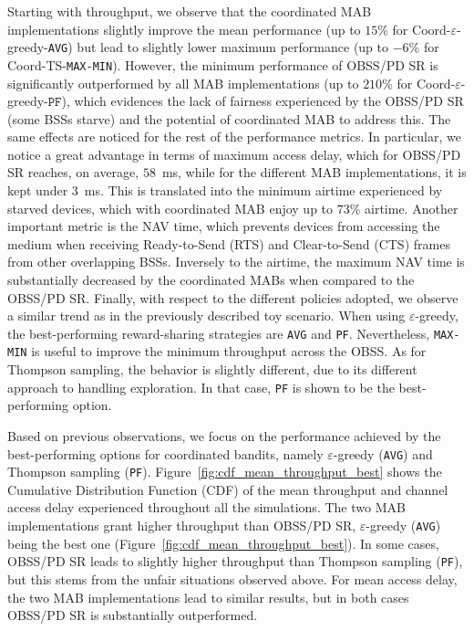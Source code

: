 Starting with throughput, we observe that the coordinated MAB implementations slightly improve the mean performance (up to $15$\% for Coord-$\varepsilon$-greedy-\texttt{AVG}) but lead to slightly lower maximum performance (up to $-6$\% for Coord-TS-\texttt{MAX-MIN}). However, the minimum performance of OBSS/PD SR is significantly outperformed by all MAB implementations (up to $210$\% for Coord-$\varepsilon$-greedy-$\texttt{PF}$), which evidences the lack of fairness experienced by the OBSS/PD SR (some BSSs starve) and the potential of coordinated MAB to address this. The same effects are noticed for the rest of the performance metrics. In particular, we notice a great advantage in terms of maximum access delay, which for OBSS/PD SR reaches, on average, $58$~ms, while for the different MAB implementations, it is kept under $3$~ms. This is translated into the minimum airtime experienced by starved devices, which with coordinated MAB enjoy up to $73$\% airtime. Another important metric is the NAV time, which prevents devices from accessing the medium when receiving Ready-to-Send (RTS) and Clear-to-Send (CTS) frames from other overlapping BSSs. Inversely to the airtime, the maximum NAV time is substantially decreased by the coordinated MABs when compared to the OBSS/PD SR. Finally, with respect to the different policies adopted, we observe a similar trend as in the previously described toy scenario. When using $\varepsilon$-greedy, the best-performing reward-sharing strategies are \texttt{AVG} and \texttt{PF}. Nevertheless, \texttt{MAX-MIN} is useful to improve the minimum throughput across the OBSS. As for Thompson sampling, the behavior is slightly different, due to its different approach to handling exploration. In that case, \texttt{PF} is shown to be the best-performing option.

Based on previous observations, we focus on the performance achieved by the best-performing options for coordinated bandits, namely $\varepsilon$-greedy (\texttt{AVG}) and Thompson sampling (\texttt{PF}). Figure~\ref{fig:cdf_mean_throughput_best} shows the Cumulative Distribution Function (CDF) of the mean throughput and channel access delay experienced throughout all the simulations. The two MAB implementations grant higher throughput than OBSS/PD SR,  $\varepsilon$-greedy (\texttt{AVG}) being the best one (Figure~\ref{fig:cdf_mean_throughput_best}). In some cases, OBSS/PD SR leads to slightly higher throughput than Thompson sampling (\texttt{PF}), but this stems from the unfair situations observed above. For mean access delay, the two MAB implementations lead to similar results, but in both cases OBSS/PD SR is substantially outperformed.

